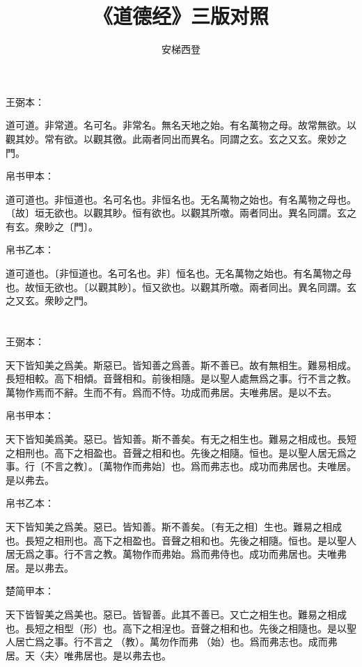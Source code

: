 \documentclass[a5paper]{ctexbook}
\title{《道德经》三版对照}
\author{安梯西登}
\date{}
\begin{document}
    \maketitle

    \tableofcontents

    \chapter{}
    王弼本：

    道可道。非常道。名可名。非常名。無名天地之始。有名萬物之母。故常無欲。以觀其妙。常有欲。以觀其徼。此兩者同出而異名。同謂之玄。玄之又玄。衆妙之門。

    
    帛书甲本：

    道可道也。非恒道也。名可名也。非恒名也。无名萬物之始也。有名萬物之母也。〔故〕垣无欲也。以觀其眇。恒有欲也。以觀其所噭。兩者同出。異名同謂。玄之有玄。衆眇之〔門〕。

    帛书乙本：

    道可道也。〔非恒道也。名可名也。非〕恒名也。无名萬物之始也。有名萬物之母也。故恒无欲也。〔以觀其眇〕。恒又欲也。以觀其所噭。兩者同出。異名同謂。玄之又玄。衆眇之門。

    \chapter{}
    王弼本：

    天下皆知美之爲美。斯惡已。皆知善之爲善。斯不善已。故有無相生。難易相成。長短相較。高下相傾。音聲相和。前後相隨。是以聖人處無爲之事。行不言之教。萬物作焉而不辭。生而不有。爲而不恃。功成而弗居。夫唯弗居。是以不去。

    
    帛书甲本：

    天下皆知美爲美。惡已。皆知善。斯不善矣。有无之相生也。難易之相成也。長短之相刑也。高下之相盈也。音聲之相和也。先後之相隨。恒也。是以聖人居无爲之事。行〔不言之教〕。〔萬物作而弗始〕也。爲而弗志也。成功而弗居也。夫唯居。是以弗去。

    帛书乙本：

    天下皆知美之爲美。惡已。皆知善。斯不善矣。〔有无之相〕生也。難易之相成也。長短之相刑也。高下之相盈也。音聲之相和也。先後之相隨。恒也。是以聖人居无爲之事。行不言之教。萬物作而弗始。爲而弗侍也。成功而弗居也。夫唯弗居。是以弗去。

    楚简甲本：

    天下皆智美之爲美也。惡已。皆智善。此其不善已。又亡之相生也。難易之相成也。長短之相型（形）也。高下之相浧也。音聲之相和也。先後之相隨也。是以聖人居亡爲之事。行不言之𡥈（教）。萬勿作而弗󶴢（始）也。爲而弗志也。成而弗居。天〈夫〉唯弗居也。是以弗去也。
\end{document}
